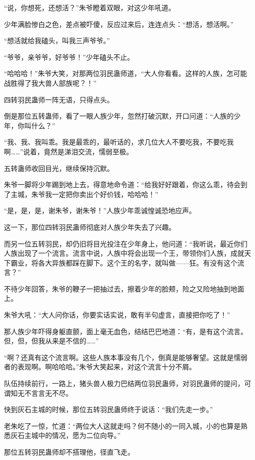 \begin{this_body}
“说，你想死，还想活？”朱爷瞪着双眼，对这少年吼道。

少年满脸惨白之色，差点被吓傻，反应过来后，连连点头：“想活，想活啊。”

“想活就给我磕头，叫我三声爷爷。”

“爷爷，亲爷爷，好爷爷！”少年磕头不止。

“哈哈哈！”朱爷大笑，对那两位羽民蛊师道，“大人你看看。这样的人族，怎可能战胜得了我大兽人部族呢？！”

四转羽民蛊师一阵无语，只得点头。

倒是那位五转蛊师，看了一眼人族少年，忽然打破沉默，开口问道：“人族的少年，你叫什么？”

“我、我、我叫乖。我是最乖的，最听话的，求几位大人不要吃我，不要吃我啊……”说着，竟然是涕泪交流，懦弱至极。

五转蛊师收回目光，继续保持沉默。

朱爷一脚将少年踢到地上去，得意地命令道：“给我好好跟着，你这么乖，待会到了主城，朱爷我一定把你卖出个好价钱，哈哈哈！”

“是，是，是，谢朱爷，谢朱爷！”人族少年乖诚惶诚恐地应声。

这一下，那位四转羽民蛊师彻底对人族少年失去了兴趣。

而另一位五转羽民，却仍旧将目光投注在少年身上，他问道：“我听说，最近你们人族出现了一个流言。流言中说，人族中将会出现一个王，带领你们人族，成就天下霸业，将各大异族都踩在脚下。这个王的名字，就叫做——狂。有没有这个流言？”

不待少年回答，朱爷的鞭子一把抽过去，擦着少年的脸颊，险之又险地抽到地面上。

朱爷大吼：“大人问你话，你要实话实说，敢有半句虚言，直接把你吃了！”

那人族少年吓得身躯直颤，面上毫无血色，结结巴巴地道：“有，是有这个流言。但，但，但我从来是不信的……”

“啊？还真有这个流言啊。这些人族本事没有几个，倒真是能够奢望。这就是懦弱者的表现啊。啊哈哈哈。”朱爷大笑起来，对这个流言十分不屑。

队伍持续前行，一路上，猪头兽人极力巴结两位羽民蛊师，对羽民蛊师的提问，可谓知无不言言无不尽。

快到灰石主城的时候，那位五转羽民蛊师终于说话：“我们先走一步。”

老朱吃了一惊，忙道：“两位大人这就走吗？何不随小的一同入城，小的也算是熟悉灰石主城中的情况，愿为二位向导。”

那位五转羽民蛊师却不搭理他，径直飞走。


\end{this_body}
